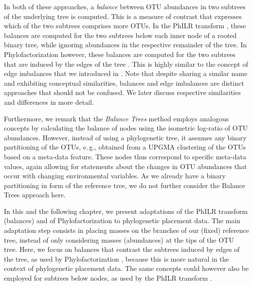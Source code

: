 
In both of these approaches, a \emph{balance} between OTU abundances in two subtrees of the underlying tree is computed.
This is a measure of contrast that expresses which of the two subtrees comprises more OTUs.
In the PhILR transform  \cite{Silverman2017}, these balances are computed
for the two subtrees below each inner node of a rooted binary tree,
while ignoring abundances in the respective remainder of the tree.
In Phylofactorization however, these balances are computed
for the two subtrees that are induced by the edges of the tree \cite{Washburne2017a}.
This is highly similar to the concept of edge imbalances 
that we introduced in .
Note that despite sharing a similar name and exhibiting conceptual similarities,
balances and edge imbalances are distinct approaches that should not be confused.
We later discuss respective similarities and differences in more detail.

Furthermore, we remark that the \emph{Balance Trees} method \cite{Morton2017} employs analogous concepts
by calculating the balance of nodes using the isometric log-ratio of OTU abundances.
However, instead of using a phylogenetic tree, it assumes any binary partitioning of the OTUs,
e.\,g., obtained from a UPGMA clustering \cite{Legendre1998} of the OTUs based on a meta-data feature.
These nodes thus correspond to specific meta-data values,
again allowing for statements about the changes in OTU abundances that occur with changing environmental variables.
As we already have a binary partitioning in form of the reference tree,
we do not further consider the Balance Trees approach here.

In this and the following chapter, we present adaptations of the PhILR transform (balances)
and of Phylofactorization to phylogenetic placement data.
The main adaptation step consists in placing masses on the branches of our (fixed) reference tree,
instead of only considering masses (abundances) at the tips of the OTU tree.
Here, we focus on balances that contrast the subtrees induced by edges of the tree,
as used by Phylofactorization \cite{Washburne2017a},
because this is more natural in the context of phylogenetic placement data.
The same concepts could however also be employed for subtrees below nodes,
as used by the PhILR transform \cite{Silverman2017}.

